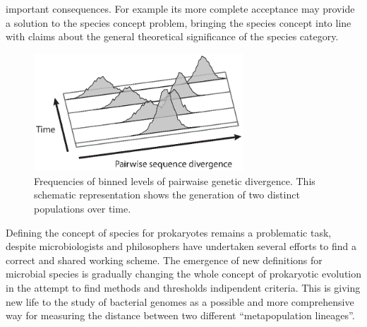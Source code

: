 important consequences. For example its more complete acceptance may provide a solution to the species concept problem, bringing the species concept into line with claims about the general theoretical significance of the species category.\\%
\begin{figure}[!tb]
	\centering
	\includegraphics[width=0.7\textwidth]{./figures/Introduction/metapopulation}
  	\caption{Frequencies of binned levels of pairwaise genetic divergence. This schematic representation shows the generation of two distinct populations over time. \label{fig:metapop}}
\end{figure}%
Defining the  concept of species for prokaryotes remains a problematic task, despite microbiologists and philosophers have undertaken several efforts to find a correct and shared working scheme. The emergence of new definitions for microbial species is gradually changing the whole concept of prokaryotic evolution in the attempt to find methods and thresholds indipendent criteria. This is giving new life to the study of bacterial genomes as a possible and more comprehensive way for measuring the distance between two different ``metapopulation lineages''.\\

